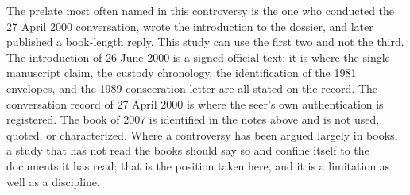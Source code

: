 The prelate most often named in this controversy is the one who
conducted the 27 April 2000 conversation, wrote the introduction to
the dossier, and later published a book-length reply. This study can
use the first two and not the third. The introduction of 26 June 2000
is a signed official text: it is where the single-manuscript claim,
the custody chronology, the identification of the 1981 envelopes, and
the 1989 consecration letter are all stated on the record. The
conversation record of 27 April 2000 is where the seer's own
authentication is registered. The book of 2007 is identified in the
notes above and is not used, quoted, or characterized. Where a
controversy has been argued largely in books, a study that has not
read the books should say so and confine itself to the documents it
has read; that is the position taken here, and it is a limitation as
well as a discipline.

